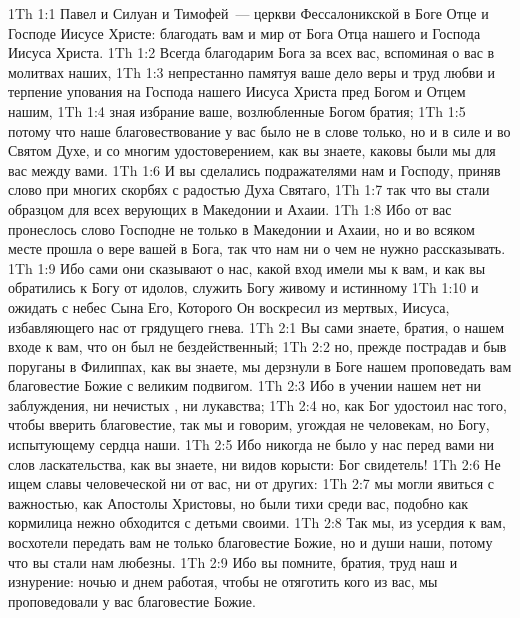 \vs 1Th 1:1 Павел и Силуан и Тимофей~--- церкви Фессалоникской в Боге Отце и Господе Иисусе Христе: благодать вам и мир от Бога Отца нашего и Господа Иисуса Христа.
\rsbpar\vs 1Th 1:2 Всегда благодарим Бога за всех вас, вспоминая о вас в молитвах наших,
\vs 1Th 1:3 непрестанно памятуя ваше дело веры и труд любви и терпение упования на Господа нашего Иисуса Христа пред Богом и Отцем нашим,
\vs 1Th 1:4 зная избрание ваше, возлюбленные Богом братия;
\vs 1Th 1:5 потому что наше благовествование у вас было не в слове только, но и в силе и во Святом Духе, и со многим удостоверением, как вы  знаете, каковы были мы для вас между вами.
\vs 1Th 1:6 И вы сделались подражателями нам и Господу, приняв слово при многих скорбях с радостью Духа Святаго,
\vs 1Th 1:7 так что вы стали образцом для всех верующих в Македонии и Ахаии.
\vs 1Th 1:8 Ибо от вас пронеслось слово Господне не только в Македонии и Ахаии, но и во всяком месте прошла  о вере вашей в Бога, так что нам ни о чем не нужно рассказывать.
\vs 1Th 1:9 Ибо сами они сказывают о нас, какой вход имели мы к вам, и как вы обратились к Богу от идолов,  служить Богу живому и истинному
\vs 1Th 1:10 и ожидать с небес Сына Его, Которого Он воскресил из мертвых, Иисуса, избавляющего нас от грядущего гнева.
\vs 1Th 2:1 Вы сами знаете, братия, о нашем входе к вам, что он был не бездейственный;
\vs 1Th 2:2 но, прежде пострадав и быв поруганы в Филиппах, как вы знаете, мы дерзнули в Боге нашем проповедать вам благовестие Божие с великим подвигом.
\vs 1Th 2:3 Ибо в учении нашем нет ни заблуждения, ни нечистых , ни лукавства;
\vs 1Th 2:4 но, как Бог удостоил нас того, чтобы вверить  благовестие, так мы и говорим, угождая не человекам, но Богу, испытующему сердца наши.
\vs 1Th 2:5 Ибо никогда не было у нас перед вами ни слов ласкательства, как вы знаете, ни видов корысти: Бог свидетель!
\vs 1Th 2:6 Не ищем славы человеческой ни от вас, ни от других:
\vs 1Th 2:7 мы могли явиться с важностью, как Апостолы Христовы, но были тихи среди вас, подобно как кормилица нежно обходится с детьми своими.
\vs 1Th 2:8 Так мы, из усердия к вам, восхотели передать вам не только благовестие Божие, но и души наши, потому что вы стали нам любезны.
\vs 1Th 2:9 Ибо вы помните, братия, труд наш и изнурение: ночью и днем работая, чтобы не отяготить кого из вас, мы проповедовали у вас благовестие Божие.
